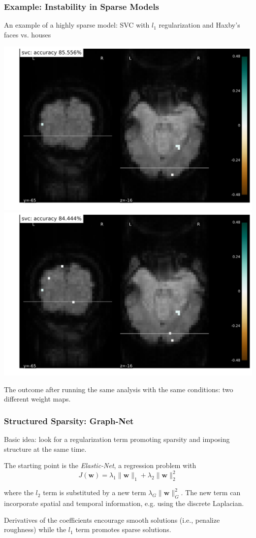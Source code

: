 \documentclass[11pt]{beamer}
\begin{document}
\begin{frame}
  \frametitle{Example: Instability in Sparse Models}
  An example of a highly sparse model: SVC with $l_1$ regularization and Haxby's
  faces vs. houses
    \begin{center}
      \includegraphics[scale=0.22]{figures/haxby_svc_plotmap_7e41.png}
      \includegraphics[scale=0.22]{figures/haxby_svc_plotmap_b073.png}
    \end{center}
    The outcome after running the same analysis with the same conditions: two
    different weight maps.
\end{frame}
\begin{frame}[t,shrink]
  \frametitle{Structured Sparsity: Graph-Net}
  Basic idea: look for a regularization term promoting sparsity and imposing
  structure at the same time.

  The starting point is the \emph{Elastic-Net}, a regression problem with
  \[J(\mathbf{w}) = \lambda_{1}\lVert{\mathbf{w}}\rVert_{1} + 
    \lambda_{2}\lVert{\mathbf{w}}\rVert_{2}^{2}\]

  where the \(l_{2}\) term is substituted by a new term
  \(\lambda_{G}\lVert{\mathbf{w}}\rVert_{G}^{2}\). The new term can incorporate
  spatial and temporal information, e.g. using the discrete Laplacian.

  Derivatives of the coefficients encourage smooth solutions
  (i.e., penalize roughness) while the $l_{1}$ term promotes sparse solutions. 

\end{frame}
\end{document}
